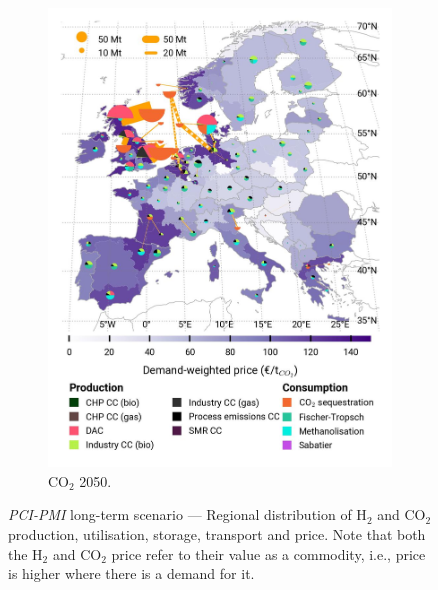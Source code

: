 \documentclass[pdflatex,sn-nature]{sn-jnl}%
\theoremstyle{thmstyleone}%
\theoremstyle{thmstyletwo}%
\theoremstyle{thmstylethree}%
\begin{document}
\begin{figure}[htbp]
\begin{subfigure}[t]{0.32\textwidth}
      \includegraphics[width=1\textwidth]{figures/pci___base_s_adm___2050-balance_map_co2_stored.jpg} 
      \caption{CO$_2$ 2050.}
      \label{fig:PCI_lt_2050_co2}
  \end{subfigure}
  \vspace{0.3cm}
  \caption{\textit{PCI-PMI} long-term scenario --- Regional distribution of H$_2$ and CO$_2$ production, utilisation, storage, transport and price. Note that both the H$_2$ and CO$_2$ price refer to their value as a commodity, i.e., price is higher where there is a demand for it.}
  \label{fig:PCI_lt}
\end{figure}
\end{document}
